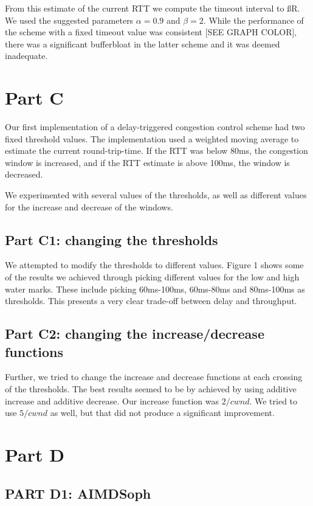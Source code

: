 \documentclass[12pt]{article}
\begin{document}
From this estimate of the current RTT we compute the timeout interval to ßR. We
used the suggested parameters $\alpha = 0.9$ and $\beta = 2$. While the
performance of the scheme with a fixed timeout value was consistent [SEE GRAPH
COLOR], there was a significant bufferbloat in the  latter scheme and it was
deemed inadequate.

\section*{Part C}

Our first implementation of a delay-triggered congestion control scheme had two
fixed threshold values. The implementation used a weighted moving average to
estimate the current round-trip-time. If the RTT was below 80ms, the congestion
window is increased, and if the RTT estimate is above 100ms, the window is
decreased.

We experimented with several values of the thresholds, as well as different
values for the increase and decrease of the windows.

\subsection*{Part C1: changing the thresholds}

We attempted to modify the thresholds to different values. Figure 1 shows some
of the results we achieved through picking different values for the low and high
water marks. These include picking 60ms-100ms, 60ms-80ms and 80ms-100ms as
thresholds. This presents a very clear trade-off between delay and throughput.

\subsection*{Part C2: changing the increase/decrease functions}

Further, we tried to change the increase and decrease functions at each crossing
of the thresholds. The best results seemed to be by achieved by using additive
increase and additive decrease. Our increase function was $2/cwnd$. We tried to
use $5/cwnd$ as well, but that did not produce a significant improvement.

\section*{Part D}

\subsection*{PART D1: AIMDSoph}
\end{document}
